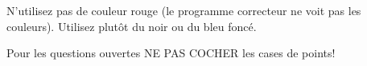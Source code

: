 \documentclass[a4paper]{article}
\begin{document}
{{%

N'utilisez pas de couleur rouge (le programme correcteur ne voit pas les couleurs). Utilisez plutôt du noir ou du bleu foncé.


\vspace{1ex}
Pour les questions ouvertes NE PAS COCHER les cases de points!
}





}
\end{document}
